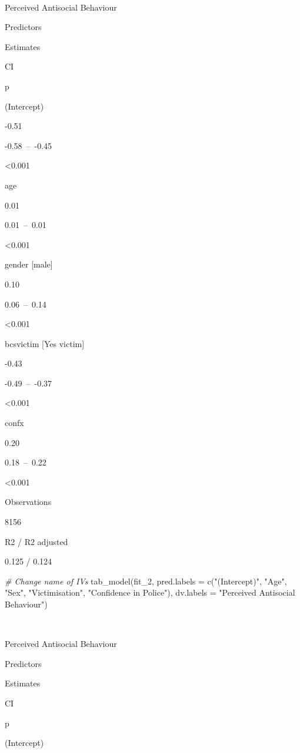 \documentclass[
]{book}
\newenvironment{Shaded}{\begin{snugshade}}{\end{snugshade}}
\newcommand{\AttributeTok}[1]{\textcolor[rgb]{0.77,0.63,0.00}{#1}}
\newcommand{\CommentTok}[1]{\textcolor[rgb]{0.56,0.35,0.01}{\textit{#1}}}
\newcommand{\FunctionTok}[1]{\textcolor[rgb]{0.00,0.00,0.00}{#1}}
\newcommand{\NormalTok}[1]{#1}
\newcommand{\StringTok}[1]{\textcolor[rgb]{0.31,0.60,0.02}{#1}}
\begin{document}
~

Perceived Antisocial Behaviour

Predictors

Estimates

CI

p

(Intercept)

-0.51

-0.58~--~-0.45

\textless0.001

age

0.01

0.01~--~0.01

\textless0.001

gender {[}male{]}

0.10

0.06~--~0.14

\textless0.001

bcsvictim {[}Yes victim{]}

-0.43

-0.49~--~-0.37

\textless0.001

confx

0.20

0.18~--~0.22

\textless0.001

Observations

8156

R2 / R2 adjusted

0.125 / 0.124

\begin{Shaded}
\begin{Highlighting}[]
\CommentTok{\# Change name of IVs}
\FunctionTok{tab\_model}\NormalTok{(fit\_2, }\AttributeTok{pred.labels =} \FunctionTok{c}\NormalTok{(}\StringTok{"(Intercept)"}\NormalTok{, }\StringTok{"Age"}\NormalTok{, }\StringTok{"Sex"}\NormalTok{, }\StringTok{"Victimisation"}\NormalTok{, }\StringTok{"Confidence in Police"}\NormalTok{), }\AttributeTok{dv.labels =} \StringTok{"Perceived Antisocial Behaviour"}\NormalTok{)}
\end{Highlighting}
\end{Shaded}

~

Perceived Antisocial Behaviour

Predictors

Estimates

CI

p

(Intercept)
\end{document}
